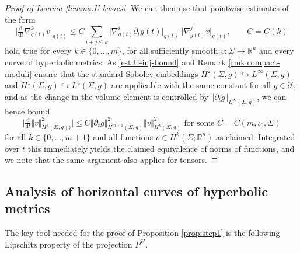 \documentclass[10pt,reqno]{amsart}
\theoremstyle{plain}
\theoremstyle{definition}
\numberwithin{equation}{section}
\newcommand{\Si}{\Sigma}
\newcommand{\R}{\ensuremath{{\mathbb R}}}
\newcommand{\norm}[1]{\Vert#1\Vert}
\newcommand{\beq}{\begin{equation}}
\newcommand{\eeq}{\end{equation}}
\newcommand{\dd}{\mathrm{d}} %
\newcommand{\pt}{\partial_t}
\newcommand{\abs}[1]{\vert#1\vert}
\newcommand{\na}{\nabla}
\newcommand{\UU}{{\mathcal U}}
\begin{document}
\begin{proof}[Proof of Lemma \ref{lemma:U-basics}]
    We can then use that pointwise estimates of the form 
    \begin{equation}\label{est:ddt_grad_k}
    	\abs{\tfrac{\dd}{\dd t} \na_{g(t)}^k v}_{g(t)}\leq  C\sum_{i+j\leq k} \abs{\na_{g(t)}^i \pt g(t)}_{g(t)}\cdot \abs{ \na_{g(t)}^j v}_{g(t)}, \qquad C=C(k)
    \end{equation}
    hold true for every $k\in \{0,\ldots, m\}$, for all sufficiently smooth $v:\Si\to \R^n$ and every curve of hyperbolic metrics. As \eqref{est:U-inj-bound} and Remark \ref{rmk:compact-moduli} ensure that the standard Sobolev embeddings $H^2(\Si,g)\hookrightarrow L^\infty(\Si,g)$ and $H^1(\Si,g)\hookrightarrow L^4(\Si,g)$ are applicable with the same constant for all $g\in \UU$, and as the change in the volume element is controlled by $\norm{\pt g}_{L^\infty(\Si,g)}$, we can hence bound
    \beq\label{est:ddt-Hm-new}
        \abs{\tfrac{\dd}{\dd t} \norm{v}_{H^k(\Si,g))}^2} \leq C \norm{\pt g}_{H^{m+1}(\Si,g)}^2 \norm{v}_{H^k(\Si,g)}^2 \text{ for some } C=C(m,\iota_0,\Si)
    \eeq
    for all $k\in\{0,\ldots,m+1\}$ and all functions $v\in H^k(\Si;\R^n)$ as claimed. Integrated over $t$ this immediately yields the claimed equivalence of norms of functions, and we note that the same argument also applies for tensors. 
\end{proof}


\subsection{Analysis of horizontal curves of hyperbolic metrics}
The key tool needed for the proof of Proposition \ref{prop:step1} is the following Lipschitz property of the projection $P^H$. 
\end{document}
